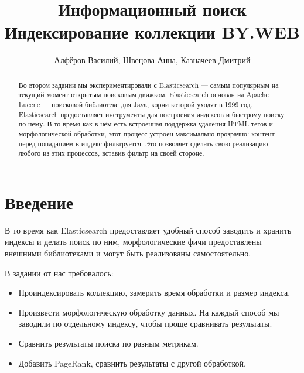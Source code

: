 \documentclass[14pt,twocolumn]{extarticle}
\title{Информационный поиск\\ Индексирование коллекции BY.WEB}
\author{Алфёров Василий, Швецова Анна, Казначеев Дмитрий}
\begin{document}
\maketitle

\begin{abstract}
    Во втором задании мы экспериментировали с Elasticsearch — самым популярным на текущий момент открытым поисковым движком. Elasticsearch основан на Apache Lucene — поисковой библиотеке для Java, корни которой уходят в 1999 год. Elasticsearch предоставляет инструменты для построения индексов и быстрому поиску по нему. В то время как в нём есть встроенная поддержка удаления HTML-тегов и морфологической обработки, этот процесс устроен максимально прозрачно: контент перед попаданием в индекс фильтруется. Это позволяет сделать свою реализацию любого из этих процессов, вставив фильтр на своей стороне.
\end{abstract}

\section{Введение}

В то время как Elasticsearch предоставляет удобный способ заводить и хранить индексы и делать поиск по ним, морфологические фичи предоставлены внешними библиотеками и могут быть реализованы самостоятельно.

В задании от нас требовалось:

\begin{itemize}
\item Проиндексировать коллекцию, замерить время обработки и размер индекса.
\item Произвести морфологическую обработку данных. На каждый способ мы заводили по отдельному индексу, чтобы проще сравнивать результаты.
\item Сравнить результаты поиска по разным метрикам.
\item Добавить PageRank, сравнить результаты с другой обработкой.
\end{itemize}






\end{document}
